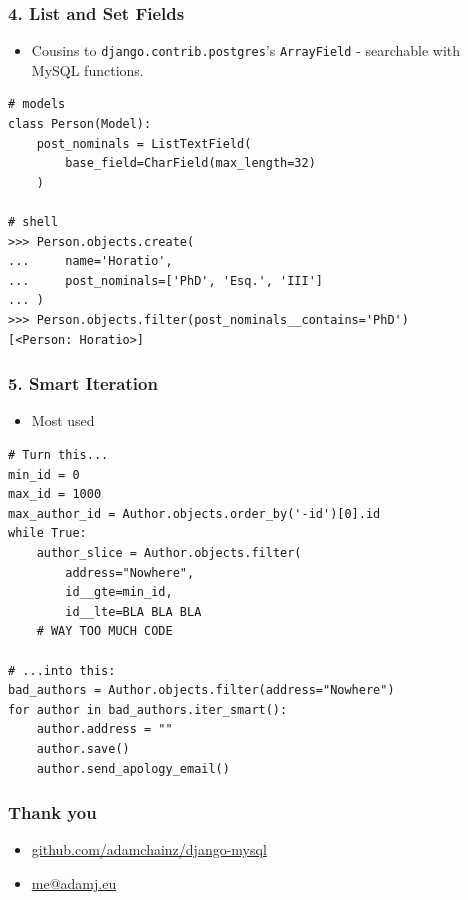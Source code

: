 \documentclass{beamer}
\begin{document}
\begin{frame}[fragile]\frametitle{4. List and Set Fields}

    \begin{itemize}
        \item Cousins to \texttt{django.contrib.postgres}'s \texttt{ArrayField}
              - searchable with MySQL functions.
    \end{itemize}


    \begin{lstlisting}
# models
class Person(Model):
    post_nominals = ListTextField(
        base_field=CharField(max_length=32)
    )

# shell
>>> Person.objects.create(
...     name='Horatio',
...     post_nominals=['PhD', 'Esq.', 'III']
... )
>>> Person.objects.filter(post_nominals__contains='PhD')
[<Person: Horatio>]
    \end{lstlisting}

\end{frame}


\begin{frame}[fragile]\frametitle{5. Smart Iteration}

    \begin{itemize}
        \item Most used
    \end{itemize}


    \begin{lstlisting}
# Turn this...
min_id = 0
max_id = 1000
max_author_id = Author.objects.order_by('-id')[0].id
while True:
    author_slice = Author.objects.filter(
        address="Nowhere",
        id__gte=min_id,
        id__lte=BLA BLA BLA
    # WAY TOO MUCH CODE

# ...into this:
bad_authors = Author.objects.filter(address="Nowhere")
for author in bad_authors.iter_smart():
    author.address = ""
    author.save()
    author.send_apology_email()
    \end{lstlisting}

\end{frame}


\begin{frame}[fragile]\frametitle{Thank you}

    \begin{itemize}
        \item \url{github.com/adamchainz/django-mysql}
        \item \url{me@adamj.eu}
    \end{itemize}

\end{frame}
\end{document}
